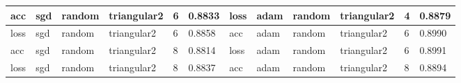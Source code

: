 \begin{table}[H]
\begin{adjustbox}{width=1\textwidth}
\begin{tabular}{|l|l|l|l|l|l||l|l|l|l|l|l|}
acc           & sgd          & random        & triangular2      & 6             & 0.8833            & loss          & adam         & random        & triangular2      & 4             & 0.8879            \\ \hline
loss          & sgd          & random        & triangular2      & 6             & 0.8858            & acc           & adam         & random        & triangular2      & 6             & 0.8990            \\ \hline
acc           & sgd          & random        & triangular2      & 8             & 0.8814            & loss          & adam         & random        & triangular2      & 6             & 0.8991            \\ \hline
loss          & sgd          & random        & triangular2      & 8             & 0.8837            & acc           & adam         & random        & triangular2      & 8             & 0.8894            \\ \hline
\end{tabular}
\end{adjustbox}
\label{t_res_densenet}
\end{table}

